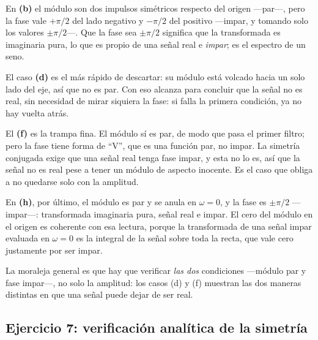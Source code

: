 \documentclass[10pt,a4paper]{article}
\begin{document}
	En \textbf{(b)} el módulo son dos impulsos simétricos respecto del origen ---par---, pero la fase vale $+\pi/2$ del lado negativo y $-\pi/2$ del positivo ---impar, y tomando solo los valores $\pm\pi/2$---. Que la fase sea $\pm\pi/2$ significa que la transformada es imaginaria pura, lo que es propio de una señal real e \emph{impar}; es el espectro de un seno.

	El caso \textbf{(d)} es el más rápido de descartar: su módulo está volcado hacia un solo lado del eje, así que no es par. Con eso alcanza para concluir que la señal no es real, sin necesidad de mirar siquiera la fase: si falla la primera condición, ya no hay vuelta atrás.

	El \textbf{(f)} es la trampa fina. El módulo sí es par, de modo que pasa el primer filtro; pero la fase tiene forma de ``V'', que es una función par, no impar. La simetría conjugada exige que una señal real tenga fase impar, y esta no lo es, así que la señal no es real pese a tener un módulo de aspecto inocente. Es el caso que obliga a no quedarse solo con la amplitud.

	En \textbf{(h)}, por último, el módulo es par y se anula en $\omega=0$, y la fase es $\pm\pi/2$ ---impar---: transformada imaginaria pura, señal real e impar. El cero del módulo en el origen es coherente con esa lectura, porque la transformada de una señal impar evaluada en $\omega=0$ es la integral de la señal sobre toda la recta, que vale cero justamente por ser impar.

	La moraleja general es que hay que verificar \emph{las dos} condiciones ---módulo par y fase impar---, no solo la amplitud: los casos (d) y (f) muestran las dos maneras distintas en que una señal puede dejar de ser real.

	\subsection*{Ejercicio 7: verificación analítica de la simetría}
\end{document}
